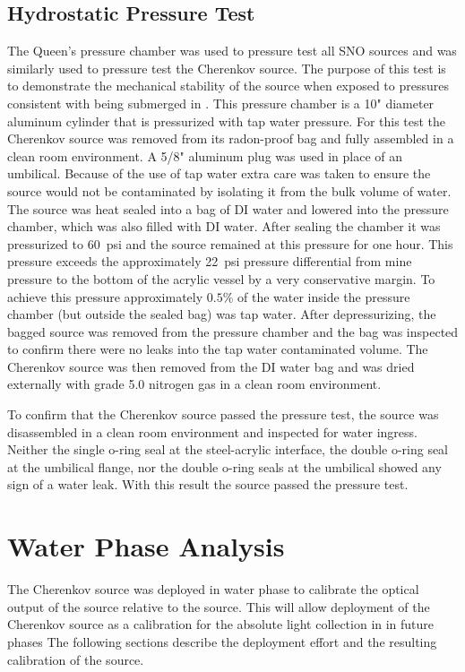 \subsection{Hydrostatic Pressure Test}

The Queen's pressure chamber was used to pressure test all SNO sources and was similarly used to pressure test the Cherenkov source. 
The purpose of this test is to demonstrate the mechanical stability of the source when exposed to pressures consistent with being submerged in {\snop}.
This pressure chamber is a 10" diameter aluminum cylinder that is pressurized with tap water pressure. For this test the Cherenkov source was removed from its radon-proof bag and fully assembled in a clean room environment. A 5/8" aluminum plug was used in place of an umbilical. Because of the use of tap water extra care was taken to ensure the source would not be contaminated by isolating it from the bulk volume of water. The source was heat sealed into a bag of DI water and lowered into the pressure chamber, which was also filled with DI water. After sealing the chamber it was pressurized to 60~psi and the source remained at this pressure for one hour. This pressure exceeds the approximately 22~psi pressure differential from mine pressure to the bottom of the acrylic vessel by a very conservative margin. To achieve this pressure approximately $0.5\%$ of the water inside the pressure chamber (but outside the sealed bag) was tap water. After depressurizing, the bagged source was removed from the pressure chamber and the bag was inspected to confirm there were no leaks into the tap water contaminated volume. The Cherenkov source was then removed from the DI water bag and was dried externally with grade 5.0 nitrogen gas in a clean room environment. 

To confirm that the Cherenkov source passed the pressure test, the source was disassembled in a clean room environment and inspected for water ingress. Neither the single o-ring seal at the steel-acrylic interface, the double o-ring seal at the umbilical flange, nor the double o-ring seals at the umbilical showed any sign of a water leak. With this result the source passed the pressure test.

\section{Water Phase Analysis}
\label{chap:water_phase}
The Cherenkov source was deployed in {\snop} water phase to calibrate the optical output of the source relative to the \N source.
This will allow deployment of the Cherenkov source as a calibration for the absolute light collection in {\snop} in future phases
The following sections describe the deployment effort and the resulting calibration of the source.

